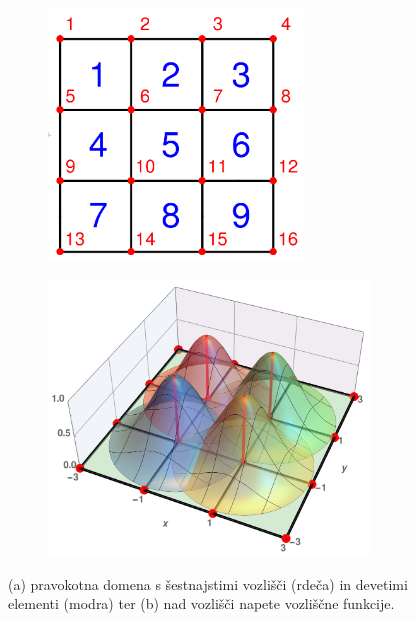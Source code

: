 \begin{figure}[ht]
    \begin{subfigure}[b]{0.42\textwidth}
        \centering
        \includegraphics[height=67mm]{Slike/undeformedRegion.png}
        \vspace{6mm}
        \caption{}
    \end{subfigure}
    \begin{subfigure}[b]{0.55\textwidth}
        \centering
        \includegraphics[width=0.94\textwidth]{Slike/undeformedNodeFs.png}
        \caption{}
    \end{subfigure}
    \caption{(a) pravokotna domena s šestnajstimi vozlišči (rdeča) in devetimi elementi (modra) ter (b) nad vozlišči napete vozliščne funkcije.}
    \label{fig:regionAndNodeFunctions}
\end{figure}

